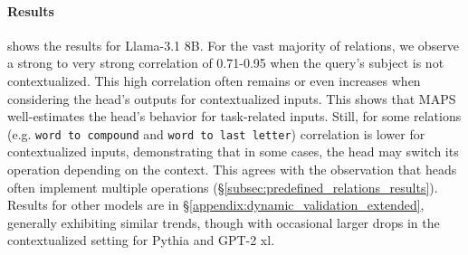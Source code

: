 \documentclass[11pt]{article}
\newcommand{\llamaThreeEightB}{Llama-3.1 8B}
\newcommand{\Pythia}{Pythia}
\newcommand{\GPTxl}{GPT-2 xl}
\newcommand{\framework}{\textsc{MAPS}}
\begin{document}
\paragraph{Results}  shows the results for \llamaThreeEightB{}.
For the vast majority of relations, we observe a strong to very strong correlation of 0.71-0.95 \cite{Schober2018CorrelationCA} when the query's subject is not contextualized. This high correlation often remains or even increases when considering the head's outputs for contextualized inputs. This shows that \framework{} well-estimates the head's behavior for task-related inputs.
Still, for some relations (e.g. \texttt{word to compound} and \texttt{word to last letter}) correlation is lower for contextualized inputs, demonstrating that in some cases, the head may switch its operation depending on the context. This agrees with the observation that heads often implement multiple operations (\S\ref{subsec:predefined_relations_results}). 
Results for other models are in \S\ref{appendix:dynamic_validation_extended}, generally exhibiting similar trends, though with occasional larger drops in the contextualized setting for \Pythia{} and \GPTxl{}.
\end{document}
